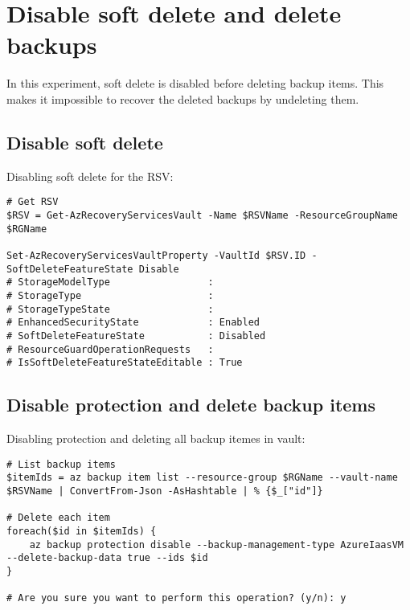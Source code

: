 \section{Disable soft delete and delete backups}
\label{app:chs3e1}
In this experiment,
soft delete is disabled before deleting backup items.
This makes it impossible to recover the deleted backups by undeleting them.

\subsection{Disable soft delete}
\label{sec:org14b0b89}
Disabling soft delete for the RSV:
\begin{verbatim}
# Get RSV
$RSV = Get-AzRecoveryServicesVault -Name $RSVName -ResourceGroupName $RGName

Set-AzRecoveryServicesVaultProperty -VaultId $RSV.ID -SoftDeleteFeatureState Disable
# StorageModelType                 :
# StorageType                      :
# StorageTypeState                 :
# EnhancedSecurityState            : Enabled
# SoftDeleteFeatureState           : Disabled
# ResourceGuardOperationRequests   :
# IsSoftDeleteFeatureStateEditable : True
\end{verbatim}

\subsection{Disable protection and delete backup items}
\label{sec:org07675b2}
Disabling protection and deleting all backup itemes in vault:
\begin{verbatim}
# List backup items
$itemIds = az backup item list --resource-group $RGName --vault-name $RSVName | ConvertFrom-Json -AsHashtable | % {$_["id"]}

# Delete each item
foreach($id in $itemIds) {
    az backup protection disable --backup-management-type AzureIaasVM --delete-backup-data true --ids $id
}

# Are you sure you want to perform this operation? (y/n): y
\end{verbatim}

